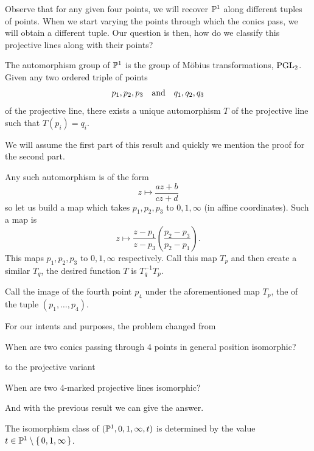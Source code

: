 \documentclass[12pt]{memoir}
\begin{document}
\begin{Rmk}
Observe that for any given four points, we will recover $\mathbb{P}^1$ along different tuples of points. When we start varying the points through which the conics pass, we will obtain a different tuple. Our question is then, how do we classify this projective lines along with their points?
\end{Rmk}

\begin{Th}
    The automorphism group of $\mathbb{P}^1$ is the group of Möbius transformations, $\operatorname{PGL}_2$. Given any two ordered triple of points 
    $$p_1,p_2,p_3\quad\text{and}\quad q_1,q_2,q_3$$
of the projective line, there exists a unique automorphism $T$
 of the projective line such that $T(p_i)=q_i$.
\end{Th}

We will assume the first part of this result and quickly we mention the proof for the second part.

\begin{ptcbp}
Any such automorphism is of the form 
$$z\mapsto \frac{az+b}{cz+d}$$
so let us build a map which takes $p_1,p_2,p_3$ to $0,1,\infty$ (in affine coordinates). Such a map is 
$$z\mapsto\frac{z-p_1}{z-p_3}\left(\frac{p_2-p_3}{p_2-p_1}\right).$$
    This maps $p_1,p_2,p_3$ to $0,1,\infty$ respectively. Call this map $T_p$ and then create a similar $T_q$, the desired function $T$ is $T_q^{-1}T_p$.
\end{ptcbp}

\begin{Def}
    Call the image of the fourth point $p_4$ under the aforementioned map $T_p$, the  of the tuple $(p_1,\dots,p_4)$. 
\end{Def}

For our intents and purposes, the problem changed from
\begin{significant}
    When are two conics passing through 4 points in general position isomorphic?
\end{significant}
to the projective variant 
\begin{significant}
    When are two 4-marked projective lines isomorphic?
\end{significant}
And with the previous result we can give the answer. 

\begin{Th}
    The isomorphism class of $(\mathbb{P}^1,0,1,\infty,t)$ is determined by the value $t\in\mathbb{P}^1\setminus\{\,0,1,\infty\,\}$. 
\end{Th}
\end{document}
